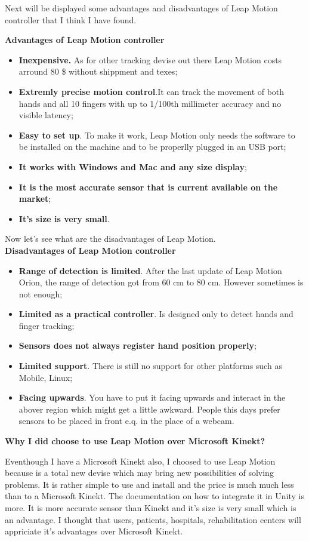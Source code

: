 Next will be displayed some advantages and disadvantages of Leap Motion controller that I think I have found.

\textbf{Advantages of Leap Motion controller}
\begin{itemize}
\item \textbf{Inexpensive.} As for other tracking devise out there Leap Motion costs arround 80 \$ without shippment and texes;
\item \textbf{Extremly precise motion control}.It can track the movement of both hands and all 10 fingers with up to 1/100th millimeter accuracy \cite{accuracy} and no visible latency;
\item \textbf{Easy to set up}. To make it work, Leap Motion only needs the software to be installed on the machine and to be properlly plugged in an USB port;
\item \textbf{It works with Windows and Mac and any size display};
\item \textbf{It is the most accurate sensor that is current available on the market};
\item \textbf{It's size is very small}.
\end{itemize}

Now let's see what are the disadvantages of Leap Motion.\\
\textbf{Disadvantages of Leap Motion controller}

\begin{itemize}
\item \textbf{Range of detection is limited}. After the last update of Leap Motion Orion, the range of detection got from 60 cm to 80 cm. However sometimes is not enough;
\item \textbf{Limited as a practical controller}. Is designed only to detect hands and finger tracking;
\item \textbf{Sensors does not always register hand position properly};
\item \textbf{Limited support}. There is still no support for other platforms such as Mobile, Linux;
\item \textbf{Facing upwards}. You have to put it facing upwards and interact in the abover region which might get a little awkward. People this days prefer sensors to be placed in front e.q. in the place of a webcam.
\end{itemize}
\textbf{Why I did choose to use Leap Motion over Microsoft Kinekt?}

Eventhough I have a Microsoft Kinekt also, I choosed to use Leap Motion because is a total new devise which may bring new possibilities of solving problems. It is rather simple to use and install and the price is much much less than to a Microsoft Kinekt. The documentation on how to integrate it in Unity is more.
It is more accurate sensor than Kinekt and it's size is very small which is an advantage. 
I thought that users, patients, hospitals, rehabilitation centers will appriciate it's advantages over Microsoft Kinekt.

